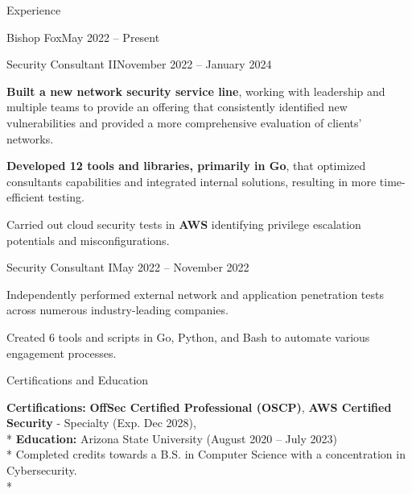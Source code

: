 \documentclass{article}
\newlength{\tabin}
\newlength{\secsep}
\newcommand{\lineunder}{\vspace*{-8pt} \\ \hspace*{-6pt} \hrulefill \\ \vspace*{-15pt}}
\newenvironment{tabbedsection}[1]{
  \begin{list}{}{
      \setlength{\itemsep}{0pt}
      \setlength{\labelsep}{0pt}
      \setlength{\labelwidth}{0pt}
      \setlength{\leftmargin}{0pt}
      \setlength{\rightmargin}{\tabin}
      \setlength{\listparindent}{0pt}
      \setlength{\parsep}{0pt}
      \setlength{\parskip}{0pt}
      \setlength{\partopsep}{0pt}
      \setlength{\topsep}{#1}
    }
  \item[]
}{\end{list}}
\newenvironment{nospacetabbing}{
    \begin{tabbing}
}{\end{tabbing}\vspace{-1.2em}}
\newenvironment{resume_section}[1]{
  \needspace{4\baselineskip}
  \vspace{2\secsep}
  \textsc{\color{blue}\large#1}
  \lineunder
  \begin{tabbedsection}{\secsep}
}{\end{tabbedsection}}
\newenvironment{subitems}{
  \renewcommand{\labelitemi}{-}
  \begin{itemize}
      \setlength{\labelsep}{1em}
}{\end{itemize}}
\newenvironment{resume_employer}[3]{
  \vspace{\secsep}
  \textbf{\color{BlueViolet}#1} \hfill {\normalsize \textbf{(#3)}} \hspace{-5em}
  \begin{tabbedsection}{0pt}
    \ifthenelse{\isempty{#2}}%
        {}%
        {\textbf{#2}}%
}{\end{tabbedsection}}
\newenvironment{resume_position}[2]{
    \vspace{\secsep}
    \textbf{#1} \hfill {\normalsize (#2)} \hspace{-2.64em}
    \begin{subitems}
}{\end{subitems}}
\begin{document}
\begin{resume_section}{Experience}
\begin{resume_employer}{Bishop Fox}{}{May 2022 -- Present}
\begin{resume_position}{Security Consultant II}{November 2022 -- January 2024}
                \item \textbf{Built a new network security service line}, working with leadership and multiple teams to provide an offering that consistently identified new vulnerabilities and provided a more comprehensive evaluation of clients' networks.
                \item \textbf{Developed 12 tools and libraries, primarily in Go}, that optimized consultants capabilities and integrated internal solutions, resulting in more time-efficient testing.
                \item Carried out cloud security tests in \textbf{AWS} identifying privilege escalation potentials and misconfigurations.
        \end{resume_position}
        \begin{resume_position}{Security Consultant I}{May 2022 -- November 2022}
            \item Independently performed external network and application penetration tests across numerous industry-leading companies.
            \item Created 6 tools and scripts in Go, Python, and Bash to automate various engagement processes.
        \end{resume_position}
    \end{resume_employer}
\end{resume_section}


\vspace{2\secsep}

\begin{resume_section}{Certifications and Education}
    \begin{nospacetabbing}
        \textbf{Certifications:} \hspace{6.5em} \=\textbf{OffSec Certified Professional (OSCP)}, \textbf{AWS Certified Security} - Specialty (Exp. Dec 2028), \\*
        \textbf{Education:} \> Arizona State University (August 2020 -- July 2023)\\*
        \>Completed credits towards a B.S. in Computer Science with a concentration in Cybersecurity.\\*
    \end{nospacetabbing}
\end{resume_section}

\vspace{-2\secsep}
\end{document}
